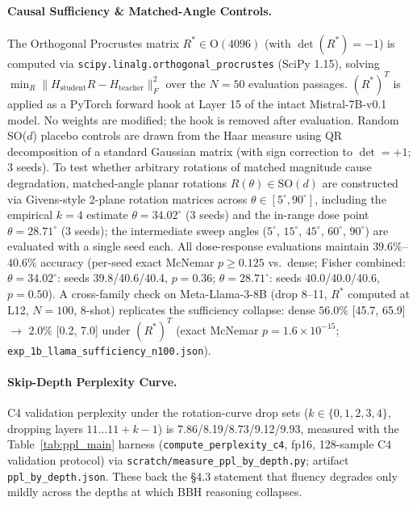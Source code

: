 \documentclass[pmlr,onecolumn]{jmlr}
\begin{document}
{\paragraph{Causal Sufficiency \& Matched-Angle Controls.}
The Orthogonal Procrustes matrix $R^* \in \text{O}(4096)$ (with $\det(R^*) = -1$) is computed via \texttt{scipy.linalg.\allowbreak{}orthogonal\_procrustes} (SciPy 1.15), solving $\min_R \|H_{\text{student}} R - H_{\text{teacher}}\|_F^2$ over the $N=50$ evaluation passages. $(R^*)^T$ is applied as a PyTorch forward hook at Layer 15 of the intact Mistral-7B-v0.1 model. No weights are modified; the hook is removed after evaluation. Random SO($d$) placebo controls are drawn from the Haar measure using QR decomposition of a standard Gaussian matrix (with sign correction to $\det = +1$; 3 seeds). To test whether arbitrary rotations of matched magnitude cause degradation, matched-angle planar rotations $R(\theta) \in \text{SO}(d)$ are constructed via Givens-style 2-plane rotation matrices across $\theta \in [5^\circ, 90^\circ]$, including the empirical $k{=}4$ estimate $\theta = 34.02^\circ$ (3 seeds) and the in-range dose point $\theta = 28.71^\circ$ (3 seeds); the intermediate sweep angles ($5^\circ$, $15^\circ$, $45^\circ$, $60^\circ$, $90^\circ$) are evaluated with a single seed each. All dose-response evaluations maintain $39.6\%$--$40.6\%$ accuracy (per-seed exact McNemar $p \ge 0.125$ vs.\ dense; Fisher combined: $\theta = 34.02^\circ$: seeds 39.8/40.6/40.4, $p = 0.36$; $\theta = 28.71^\circ$: seeds 40.0/40.0/40.6, $p = 0.50$). A cross-family check on Meta-Llama-3-8B (drop 8--11, $R^*$ computed at L12, $N=100$, 8-shot) replicates the sufficiency collapse: dense $56.0\%$ [45.7, 65.9] $\to$ $2.0\%$ [0.2, 7.0] under $(R^*)^T$ (exact McNemar $p = 1.6\times10^{-15}$; \texttt{exp\_1b\_llama\_sufficiency\_n100.json}).

\paragraph{Skip-Depth Perplexity Curve.}
C4 validation perplexity under the rotation-curve drop sets ($k \in \{0,1,2,3,4\}$, dropping layers $11\ldots 11{+}k{-}1$) is 7.86/8.19/8.73/9.12/9.93, measured with the Table~\ref{tab:ppl_main} harness (\texttt{compute\_perplexity\_c4}, fp16, 128-sample C4 validation protocol) via \texttt{scratch/measure\_ppl\_by\_depth.py}; artifact \texttt{ppl\_by\_depth.json}. These back the \S4.3 statement that fluency degrades only mildly across the depths at which BBH reasoning collapses.

}
\end{document}
